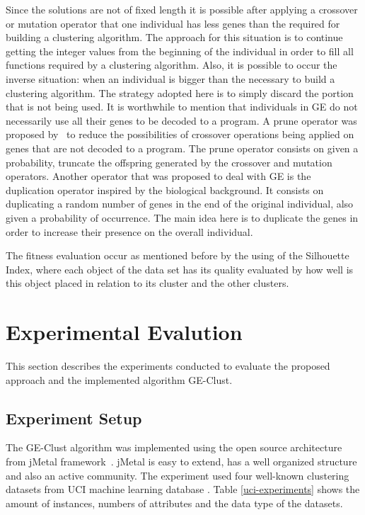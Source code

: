 \documentclass[conference,compsoc]{IEEEtran}
\begin{document}
Since the solutions are not of fixed length it is possible after applying a crossover or mutation operator that one individual has less genes than the required for building a clustering algorithm. The approach for this situation is to continue getting the integer values from the beginning of the individual in order to fill all functions required by a clustering algorithm. Also, it is possible to occur the inverse situation: when an individual is bigger than the necessary to build a clustering algorithm. The strategy adopted here is to simply discard the portion that is not being used. It is worthwhile to mention that individuals in GE do not necessarily use all their genes to be decoded to a program. A prune operator was proposed by~\cite{ryan1998grammatical} to reduce the possibilities of crossover operations being applied on genes that are not decoded to a program. The prune operator consists on given a probability, truncate the offspring generated by the crossover and mutation operators. Another operator that was proposed to deal with GE is the duplication operator inspired by the biological background. It consists on duplicating a random number of genes in the end of the original individual, also given a probability of occurrence. The main idea here is to duplicate the genes in order to increase their presence on the overall individual.

The fitness evaluation occur as mentioned before by the using of the Silhouette Index, where each object of the data set has its quality evaluated by how well is this object placed in relation to its cluster and the other clusters.


\section{Experimental Evalution} \label{sec:experiments}

This section describes the experiments conducted to evaluate the proposed approach and the implemented algorithm GE-Clust.


\subsection{Experiment Setup}

The GE-Clust algorithm was implemented using the open source architecture from jMetal framework~\cite{durillo2011jmetal}. jMetal is easy to extend, has a well organized structure and also an active community. The experiment used four well-known clustering datasets from UCI machine learning database \cite{uci}. Table \ref{uci-experiments} shows the amount of instances, numbers of attributes and the data type of the datasets. 
\end{document}
